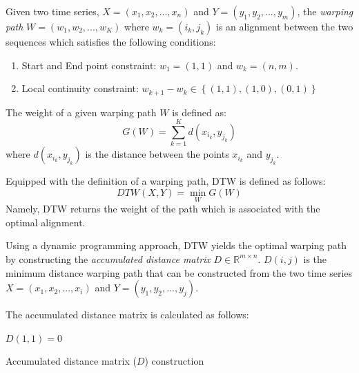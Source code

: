 \iftoggle{edit-mode}{\hspace{0pt}\marginpar{Warping path Definition}}{}
\begin{definition}
Given two time series, $X = (x_1,x_2,...,x_n)$ and $Y = (y_1,y_2,...,y_m)$, the \emph{warping path} $W=(w_1,w_2,...,w_K)$ where ${w_k} = (i_k,j_k)$ is an alignment between the two sequences which satisfies the following conditions: 
\begin{enumerate}
\item Start and End point constraint: $w_1 = (1,1)$ and $w_k = (n,m)$. 
\item Local continuity constraint: ${w_{k + 1}} - {w_k} \in \left\{ {\left( {1,1} \right),\left( {1,0} \right),\left( {0,1} \right)} \right\}$
\end{enumerate}	 
The weight of a given warping path $W$ is defined as:
\begin{equation}
G(W) = \sum\limits_{k = 1}^{K} d(x_{i_k},y_{j_k} )
\end{equation}
where $d(x_{i_k},y_{j_k})$ is the distance between the points $x_{i_k}$ and $y_{j_k}$.
\label{def:warping_path}
\end{definition}

\iftoggle{edit-mode}{\hspace{0pt}\marginpar{DTW Definition}}{}
Equipped with the definition of a warping path, DTW is defined as follows:
\begin{equation}
DTW(X,Y)=\min\limits_{W} {G(W)}
\end{equation}
Namely, DTW returns the weight of the path which is associated with the optimal alignment.

\iftoggle{edit-mode}{\hspace{0pt}\marginpar{Accumulated distance matrix}}{}
Using a dynamic programming approach, DTW yields the optimal warping path by constructing the \emph{accumulated distance matrix} $D \in \mathbb{R}^{m \times n}$. 
$D(i,j)$ is the minimum distance warping path that can be constructed from the two time series $X = \left( {{x_1},{x_2},...,{x_i}} \right)$ and $Y = \left( {{y_1},{y_2},...,{y_j}} \right)$.

The accumulated distance matrix is calculated as follows: 
\begin{algorithm}
$D(1,1) = 0$\;
\caption{Accumulated distance matrix ($D$) construction}
\label{alg:adm_dtw}
\end{algorithm}


